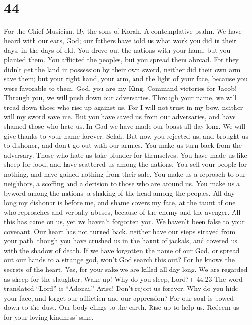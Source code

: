 \hypertarget{section-43}{%
\section{44}\label{section-43}}

For the Chief Musician. By the sons of Korah. A contemplative psalm.
 We have heard with our ears, God; our fathers have told us
what work you did in their days, in the days of old.  You
drove out the nations with your hand, but you planted them. You
afflicted the peoples, but you spread them abroad.  For they
didn't get the land in possession by their own sword, neither did their
own arm save them; but your right hand, your arm, and the light of your
face, because you were favorable to them.  God, you are my
King. Command victories for Jacob!  Through you, we will
push down our adversaries. Through your name, we will tread down those
who rise up against us.  For I will not trust in my bow,
neither will my sword save me.  But you have saved us from
our adversaries, and have shamed those who hate us.  In God
we have made our boast all day long. We will give thanks to your name
forever. Selah.  But now you rejected us, and brought us to
dishonor, and don't go out with our armies.  You make us
turn back from the adversary. Those who hate us take plunder for
themselves.  You have made us like sheep for food, and have
scattered us among the nations.  You sell your people for
nothing, and have gained nothing from their sale.  You make
us a reproach to our neighbors, a scoffing and a derision to those who
are around us.  You make us a byword among the nations, a
shaking of the head among the peoples.  All day long my
dishonor is before me, and shame covers my face,  at the
taunt of one who reproaches and verbally abuses, because of the enemy
and the avenger.  All this has come on us, yet we haven't
forgotten you. We haven't been false to your covenant.  Our
heart has not turned back, neither have our steps strayed from your
path,  though you have crushed us in the haunt of jackals,
and covered us with the shadow of death.  If we have
forgotten the name of our God, or spread out our hands to a strange god,
 won't God search this out? For he knows the secrets of the
heart.  Yes, for your sake we are killed all day long. We
are regarded as sheep for the slaughter.  Wake up! Why do
you sleep, Lord?+ 44:23 The word translated ``Lord'' is ``Adonai.''
Arise! Don't reject us forever.  Why do you hide your face,
and forget our affliction and our oppression?  For our soul
is bowed down to the dust. Our body clings to the earth. 
Rise up to help us. Redeem us for your loving kindness' sake.

